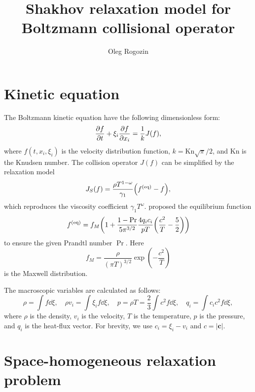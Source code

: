 \documentclass{article}
\title{Shakhov relaxation model for Boltzmann collisional operator}
\author{Oleg Rogozin}
\newcommand{\Kn}{\mathrm{Kn}}
\newcommand{\equil}[1]{#1^\mathrm{(eq)}}
\begin{document}
\maketitle
\tableofcontents

\section{Kinetic equation}

The Boltzmann kinetic equation have the following dimensionless form:
\begin{equation}\label{eq:Boltzmann}
    \pdv{f}{t} + \xi_i\pdv{f}{x_i} = \frac1kJ(f),
\end{equation}
where $f(t,x_i,\xi_i)$ is the velocity distribution function, $k=\Kn\sqrt\pi/2$,
and $\Kn$ is the Knudsen number.
The collision operator $J(f)$ can be simplified by the relaxation model
\begin{equation}\label{eq:model}
    J_S(f) = \frac{\rho T^{1-\omega}}{\gamma_1}\qty(\equil{f} - f),
\end{equation}
which reproduces the viscosity coefficient $\gamma_1T^\omega$.
\textcite{shakhov1968generalization} proposed the equilibrium function
\begin{equation}\label{eq:Shakhov}
    \equil{f} = f_M\qty(1 + \frac{1-\Pr}{5\pi^{3/2}}\frac{4q_ic_i}{pT}\qty(\frac{c^2}T - \frac52))
\end{equation}
to ensure the given Prandtl number $\Pr$. Here
\begin{equation}\label{eq:Maxwell}
    f_M = \frac{\rho}{(\pi T)^{3/2}}\exp(-\frac{c^2}T)
\end{equation}
is the Maxwell distribution.

The macroscopic variables are calculated as follows:
\begin{equation}\label{eq:macro}
    \rho = \int f \dd\xi, \quad
    \rho v_i = \int \xi_i f \dd\xi, \quad
    p = \rho T = \frac23\int c^2 f \dd\xi, \quad
    q_i = \int c_i c^2 f \dd\xi,
\end{equation}
where \(\rho\) is the density, \(v_i\) is the velocity, \(T\) is the temperature, \(p\) is the pressure,
and \(q_i\) is the heat-flux vector. For brevity, we use \(c_i = \xi_i - v_i\) and \(c = |\boldsymbol{c}|\).

\section{Space-homogeneous relaxation problem}
\end{document}
